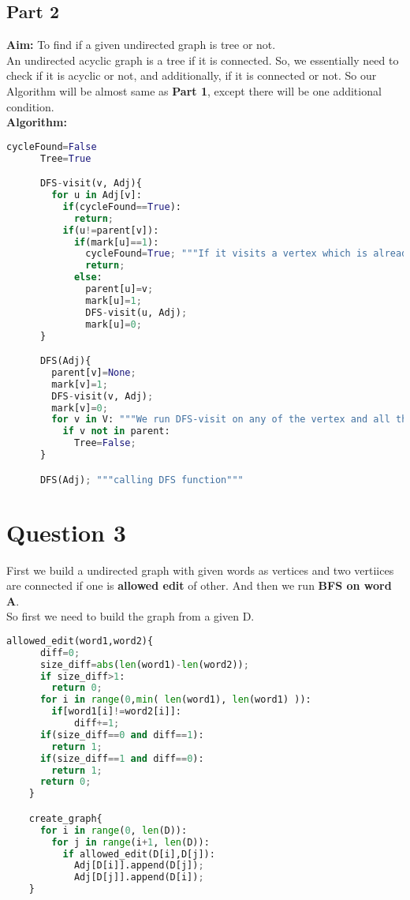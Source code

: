 \documentclass{article}
\begin{document}
  \subsection*{Part 2}
    \textbf{Aim:} To find if a given undirected graph is tree or not. \\
    An undirected acyclic graph is a tree if it is connected. So, we essentially need to check if it is acyclic or not, and additionally,
    if it is connected or not. So our Algorithm will be almost same as \textbf{Part 1}, except there will be one additional condition.\\
    \textbf{Algorithm:}
    \begin{lstlisting}[language=Python]
      cycleFound=False
      Tree=True

      DFS-visit(v, Adj){
        for u in Adj[v]:
          if(cycleFound==True):
            return;
          if(u!=parent[v]):
            if(mark[u]==1):
              cycleFound=True; """If it visits a vertex which is already in process, means cycle is found"""
              return;
            else:
              parent[u]=v;
              mark[u]=1;
              DFS-visit(u, Adj);
              mark[u]=0;
      }

      DFS(Adj){
        parent[v]=None;
        mark[v]=1;
        DFS-visit(v, Adj);
        mark[v]=0;
        for v in V: """We run DFS-visit on any of the vertex and all the vertices should have been visited if it is a tree"""
          if v not in parent:
            Tree=False;
      }

      DFS(Adj); """calling DFS function"""
    \end{lstlisting}


\section*{Question 3}
  First we build a undirected graph with given words as vertices and two vertiices are connected if one is \textbf{allowed edit} of other.
  And then we run \textbf{BFS on word A}. \\
  So first we need to build the graph from a given D.
  \begin{lstlisting}[language=Python]
    allowed_edit(word1,word2){
      diff=0;
      size_diff=abs(len(word1)-len(word2));
      if size_diff>1:
        return 0;
      for i in range(0,min( len(word1), len(word1) )):
        if[word1[i]!=word2[i]]:
            diff+=1;
      if(size_diff==0 and diff==1):
        return 1;
      if(size_diff==1 and diff==0):
        return 1;
      return 0;
    }

    create_graph{
      for i in range(0, len(D)):
        for j in range(i+1, len(D)):
          if allowed_edit(D[i],D[j]):
            Adj[D[i]].append(D[j]);
            Adj[D[j]].append(D[i]);
    }

  \end{lstlisting}
\end{document}
